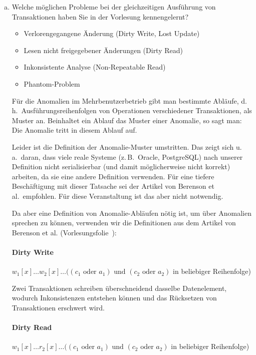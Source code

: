 \begin{enumerate}[a)]
	\item Welche möglichen Probleme bei der gleichzeitigen Ausführung von Transaktionen haben Sie in der Vorlesung kennengelernt?

\begin{solution}
\begin{itemize}
	\item Verlorengegangene Änderung (Dirty Write, Lost Update)
	\item Lesen nicht freigegebener Änderungen (Dirty Read)
	\item Inkonsistente Analyse (Non-Repeatable Read)
	\item Phantom-Problem
\end{itemize}
Für die Anomalien im Mehrbenutzerbetrieb gibt man bestimmte Abläufe,
d.\,h.\ Ausführungsreihenfolgen von Operationen verschiedener Transaktionen,
als Muster an.
Beinhaltet ein Ablauf das Muster einer Anomalie,
so sagt man:
Die Anomalie tritt in diesem Ablauf auf.

Leider ist die Definition der Anomalie-Muster umstritten.
Das zeigt sich u.\,a.\ daran, dass viele reale Systeme (z.\,B.\ Oracle, PostgreSQL) nach unserer Definition nicht serialisierbar (und damit möglicherweise nicht korrekt) arbeiten, da sie eine andere Definition verwenden.
Für eine tiefere Beschäftigung mit dieser Tatsache sei der Artikel von Berenson et al.\ empfohlen.
Für diese Veranstaltung ist das aber nicht notwendig.

Da aber eine Definition von Anomalie-Abläufen nötig ist, um über Anomalien sprechen zu können, verwenden wir die Definitionen aus dem Artikel von Berenson et al. (Vorlesungsfolie~\AnomalieDef):

\paragraph{\color{solutioncolor}Dirty Write}
$w_1[x] \ldots w_2[x] \ldots
((c_1 \textrm{ oder } a_1) \textrm{ und } (c_2 \textrm{ oder } a_2)$
in beliebiger Reihenfolge)

Zwei Transaktionen schreiben überschneidend dasselbe Datenelement,
wodurch Inkonsistenzen entstehen können
und das Rücksetzen von Transaktionen erschwert wird.

\paragraph{\color{solutioncolor}Dirty Read}
$w_1[x] \ldots r_2[x] \ldots
((c_1 \textrm{ oder } a_1) \textrm{ und } (c_2 \textrm{ oder } a_2)$
in beliebiger Reihenfolge)


\end{solution}
\end{enumerate}
